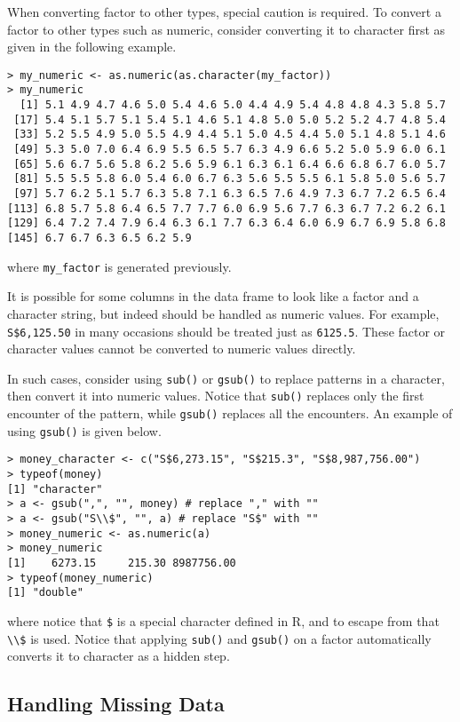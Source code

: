 When converting factor to other types, special caution is required. To convert a factor to other types such as numeric, consider converting it to character first as given in the following example.
\begin{lstlisting}
> my_numeric <- as.numeric(as.character(my_factor))
> my_numeric
  [1] 5.1 4.9 4.7 4.6 5.0 5.4 4.6 5.0 4.4 4.9 5.4 4.8 4.8 4.3 5.8 5.7
 [17] 5.4 5.1 5.7 5.1 5.4 5.1 4.6 5.1 4.8 5.0 5.0 5.2 5.2 4.7 4.8 5.4
 [33] 5.2 5.5 4.9 5.0 5.5 4.9 4.4 5.1 5.0 4.5 4.4 5.0 5.1 4.8 5.1 4.6
 [49] 5.3 5.0 7.0 6.4 6.9 5.5 6.5 5.7 6.3 4.9 6.6 5.2 5.0 5.9 6.0 6.1
 [65] 5.6 6.7 5.6 5.8 6.2 5.6 5.9 6.1 6.3 6.1 6.4 6.6 6.8 6.7 6.0 5.7
 [81] 5.5 5.5 5.8 6.0 5.4 6.0 6.7 6.3 5.6 5.5 5.5 6.1 5.8 5.0 5.6 5.7
 [97] 5.7 6.2 5.1 5.7 6.3 5.8 7.1 6.3 6.5 7.6 4.9 7.3 6.7 7.2 6.5 6.4
[113] 6.8 5.7 5.8 6.4 6.5 7.7 7.7 6.0 6.9 5.6 7.7 6.3 6.7 7.2 6.2 6.1
[129] 6.4 7.2 7.4 7.9 6.4 6.3 6.1 7.7 6.3 6.4 6.0 6.9 6.7 6.9 5.8 6.8
[145] 6.7 6.7 6.3 6.5 6.2 5.9
\end{lstlisting}
where \verb|my_factor| is generated previously.

It is possible for some columns in the data frame to look like a factor and a character string, but indeed should be handled as numeric values. For example, \verb|S$6,125.50| in many occasions should be treated just as \verb|6125.5|. These factor or character values cannot be converted to numeric values directly.

In such cases, consider using \verb|sub()| or \verb|gsub()| to replace patterns in a character, then convert it into numeric values. Notice that \verb|sub()| replaces only the first encounter of the pattern, while \verb|gsub()| replaces all the encounters. An example of using \verb|gsub()| is given below.
\begin{lstlisting}
> money_character <- c("S$6,273.15", "S$215.3", "S$8,987,756.00")
> typeof(money)
[1] "character"
> a <- gsub(",", "", money) # replace "," with ""
> a <- gsub("S\\$", "", a) # replace "S$" with ""
> money_numeric <- as.numeric(a)
> money_numeric
[1]    6273.15     215.30 8987756.00
> typeof(money_numeric)
[1] "double"
\end{lstlisting}
where notice that \verb|$| is a special character defined in R, and to escape from that \verb|\\$| is used. Notice that applying \verb|sub()| and \verb|gsub()| on a factor automatically converts it to character as a hidden step.

\subsection{Handling Missing Data}

